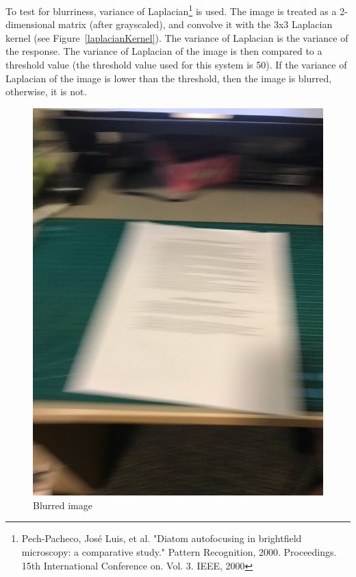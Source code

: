 To test for blurriness, variance of Laplacian\footnote{Pech-Pacheco, José Luis, et al. "Diatom autofocusing in brightfield microscopy: a comparative study." Pattern Recognition, 2000. Proceedings. 15th International Conference on. Vol. 3. IEEE, 2000} is used. The image is treated as a 2-dimensional matrix (after grayscaled), and convolve it with the 3x3 Laplacian kernel (see Figure~\ref{laplacianKernel}). The variance of Laplacian is the variance of the response. The variance of Laplacian of the image is then compared to a threshold value (the threshold value used for this system is 50). If the variance of Laplacian of the image is lower than the threshold, then the image is blurred, otherwise, it is not.
\begin{figure}
	\centering
    \includegraphics[scale = 0.075]{blur.jpg}
    
    \caption{Blurred image}
	\label{blurredImage}
\end{figure}

